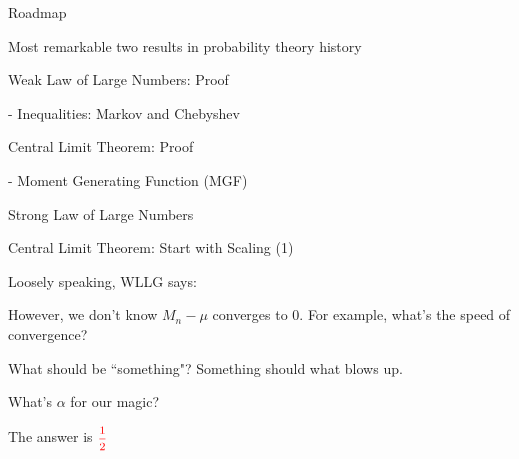 \documentclass[fleqn,aspectratio=169]{beamer}
\begin{document}
\begin{frame}{Roadmap}

\plitemsep 0.1in

\bci 
\item Most remarkable two results in probability theory history

\bigskip

\item {}
\item {}
\item Weak Law of Large Numbers: Proof

- Inequalities: Markov and Chebyshev

\item Central Limit Theorem: Proof

- Moment Generating Function (MGF)

\item Strong Law of Large Numbers
\eci 

\end{frame}


\begin{frame}{Central Limit Theorem: Start with Scaling (1)}

\plitemsep 0.1in
 \bci 
 \item<1-> Loosely speaking, WLLG says:

\item<2-> However, we don't know  $M_n -\mu$ converges to 0. For example, what's the speed of convergence? 

\item<3->  What should be ``something"? Something should what blows up. 
\item<5-> What's $\alpha$ for our magic? 

\item<6-> The answer is $\redf{\mfrac{1}{2}}$

\eci 
\end{frame}
\end{document}
